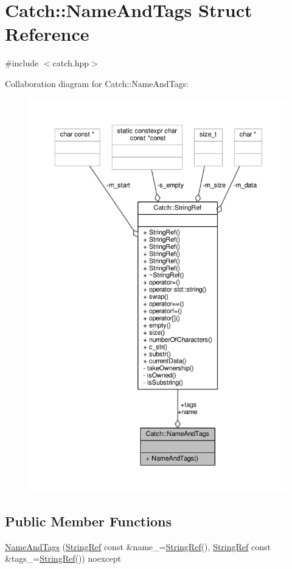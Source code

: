 \hypertarget{struct_catch_1_1_name_and_tags}{\section{Catch\-:\-:Name\-And\-Tags Struct Reference}
\label{struct_catch_1_1_name_and_tags}
}


{\ttfamily \#include $<$catch.\-hpp$>$}



Collaboration diagram for Catch\-:\-:Name\-And\-Tags\-:
\nopagebreak
\begin{figure}[H]
\begin{center}
\leavevmode
\includegraphics[width=350pt]{struct_catch_1_1_name_and_tags__coll__graph}
\end{center}
\end{figure}
\subsection*{Public Member Functions}
\begin{DoxyCompactItemize}
\item 
\hyperlink{struct_catch_1_1_name_and_tags_ab585111e615ce8c504a2b9630de8ee94}{Name\-And\-Tags} (\hyperlink{class_catch_1_1_string_ref}{String\-Ref} const \&name\-\_\-=\hyperlink{class_catch_1_1_string_ref}{String\-Ref}(), \hyperlink{class_catch_1_1_string_ref}{String\-Ref} const \&tags\-\_\-=\hyperlink{class_catch_1_1_string_ref}{String\-Ref}()) noexcept
\end{DoxyCompactItemize}
